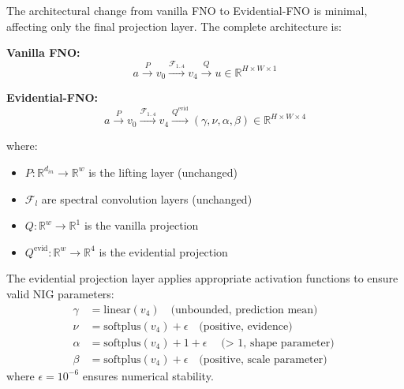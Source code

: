 The architectural change from vanilla FNO to Evidential-FNO is minimal, affecting only the final projection layer. 
The complete architecture is:

\textbf{Vanilla FNO:}
\begin{equation}
    a \xrightarrow{P} v_0 \xrightarrow{\mathcal{F}_{1..4}} v_4 \xrightarrow{Q} u \in \mathbb{R}^{H \times W \times 1}
\end{equation}

\textbf{Evidential-FNO:}
\begin{equation}
    a \xrightarrow{P} v_0 \xrightarrow{\mathcal{F}_{1..4}} v_4 \xrightarrow{Q^{\text{evid}}} (\gamma, \nu, \alpha, \beta) \in \mathbb{R}^{H \times W \times 4}
\end{equation}

where:
\begin{itemize}
    \item $P: \mathbb{R}^{d_{in}} \rightarrow \mathbb{R}^{w}$ is the lifting layer (unchanged)
    \item $\mathcal{F}_l$ are spectral convolution layers (unchanged)
    \item $Q: \mathbb{R}^{w} \rightarrow \mathbb{R}^{1}$ is the vanilla projection
    \item $Q^{\text{evid}}: \mathbb{R}^{w} \rightarrow \mathbb{R}^{4}$ is the evidential projection
\end{itemize}

The evidential projection layer applies appropriate activation functions to ensure valid NIG parameters:
\begin{align}
    \gamma &= \text{linear}(v_4) \quad \text{(unbounded, prediction mean)} \\
    \nu &= \text{softplus}(v_4) + \epsilon \quad \text{(positive, evidence)} \\
    \alpha &= \text{softplus}(v_4) + 1 + \epsilon \quad \text{($>$ 1, shape parameter)} \\
    \beta &= \text{softplus}(v_4) + \epsilon \quad \text{(positive, scale parameter)}
\end{align}
where $\epsilon = 10^{-6}$ ensures numerical stability.

